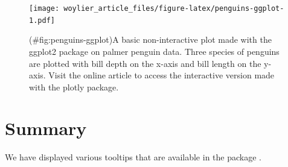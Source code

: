 \begin{figure}
\centering
\texttt{[image: woylier\_article\_files/figure-latex/penguins-ggplot-1.pdf]}
\caption{(\#fig:penguins-ggplot)A basic non-interactive plot made with the ggplot2 package on palmer penguin data. Three species of penguins are plotted with bill depth on the x-axis and bill length on the y-axis. Visit the online article to access the interactive version made with the plotly package.}
\end{figure}

\hypertarget{summary}{%
\section{Summary}\label{summary}}

We have displayed various tooltips that are available in the package .

